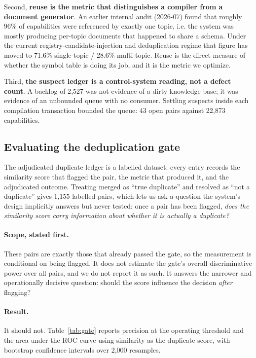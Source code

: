 \documentclass[10pt,a4paper]{article}
\begin{document}
Second, \textbf{reuse is the metric that distinguishes a compiler from a document
generator}. An earlier internal audit (2026-07) found that roughly 96\% of
capabilities were referenced by exactly one topic, i.e. the system was mostly
producing per-topic documents that happened to share a schema. Under the current
registry-candidate-injection and deduplication regime that figure has moved to
71.6\% single-topic / 28.6\% multi-topic. Reuse is the direct measure of whether
the symbol table is doing its job, and it is the metric we optimize.

Third, \textbf{the suspect ledger is a control-system reading, not a defect
count}. A backlog of 2{,}527 was not evidence of a dirty knowledge base; it was
evidence of an unbounded queue with no consumer. Settling suspects inside each
compilation transaction bounded the queue: 43 open pairs against 22{,}873
capabilities.

\subsection{Evaluating the deduplication gate}
\label{sec:gateeval}

The adjudicated duplicate ledger is a labelled dataset: every entry records the
similarity score that flagged the pair, the metric that produced it, and the
adjudicated outcome. Treating \textsf{merged} as ``true duplicate'' and
\textsf{resolved} as ``not a duplicate'' gives 1{,}155 labelled pairs, which lets
us ask a question the system's design implicitly answers but never tested: once a
pair has been flagged, \emph{does the similarity score carry information about
whether it is actually a duplicate?}

\paragraph{Scope, stated first.} These pairs are exactly those that already
passed the gate, so the measurement is conditional on being flagged. It does not
estimate the gate's overall discriminative power over all pairs, and we do not
report it as such. It answers the narrower and operationally decisive question:
should the score influence the decision \emph{after} flagging?

\paragraph{Result.} It should not. Table~\ref{tab:gate} reports precision at the
operating threshold and the area under the ROC curve using similarity as the
duplicate score, with bootstrap confidence intervals over 2{,}000 resamples.
\end{document}
